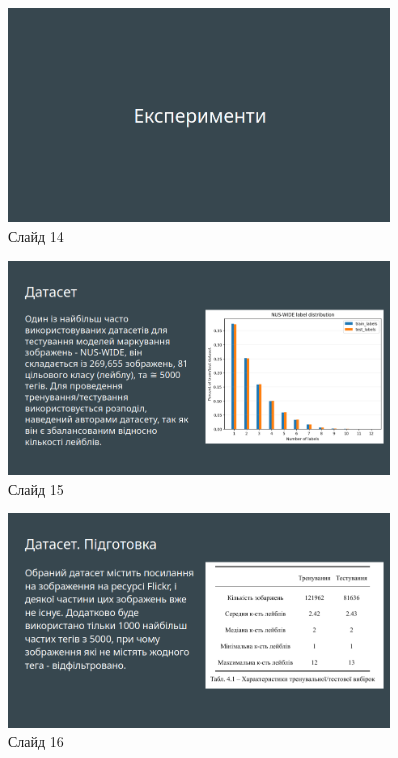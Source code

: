 \documentclass{udstu}
\begin{document}
\begin{figure}[!ht]
	\centering
	\includegraphics[width=0.9\textwidth]{PNG/present/present-14}
	\caption{Слайд 14}
\end{figure}

\begin{figure}[!ht]
	\centering
	\includegraphics[width=0.9\textwidth]{PNG/present/present-15}
	\caption{Слайд 15}
\end{figure}

\begin{figure}[!ht]
	\centering
	\includegraphics[width=0.9\textwidth]{PNG/present/present-16}
	\caption{Слайд 16}
\end{figure}
\end{document}

